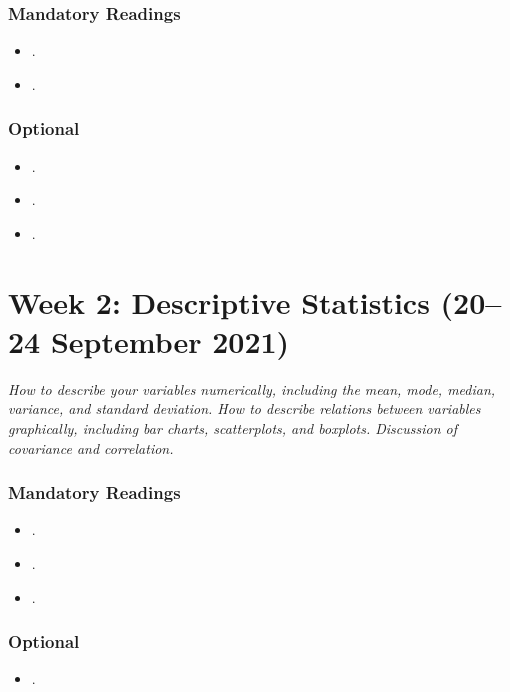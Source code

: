 \documentclass[abstract=on,parskip=full,headings=standardclasses,fontsize=11pt,paper=a4]{scrartcl}
\begin{document}
\subsubsection*{Mandatory Readings}
\begin{itemize}
\item {}.
\item {}.
\end{itemize}

\subsubsection*{Optional}
\begin{itemize}
\item {}.
\item {}.
\item {}.
\end{itemize}

\section{Week 2: Descriptive Statistics (20--24 September 2021)}

\textit{How to describe your variables numerically, including the mean, mode, median, variance, and standard deviation. How to describe relations between variables graphically, including bar charts, scatterplots, and boxplots. Discussion of covariance and correlation.}

\subsubsection*{Mandatory Readings}
\begin{itemize}
\item {}.
\item {}.
\item {}.
\end{itemize}

\subsubsection*{Optional}
\begin{itemize}
\item {}.
\end{itemize}
\end{document}
